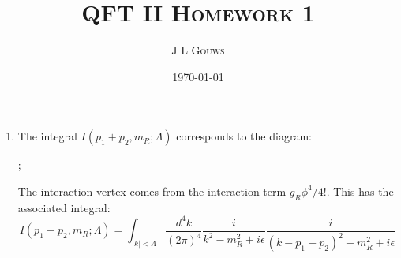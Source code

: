 \documentclass[12pt,a4]{article}
\title{
\textsc{QFT II Homework 1}
}
\author{\textsc{J L Gouws}
}
\date{\today
\\[1cm]}
\begin{document}
\thispagestyle{empty}

\maketitle

\begin{enumerate}
  \item
    \begin{enumerate}
      The integral $I(p_1 + p_2, m_R;\Lambda)$ corresponds to the diagram:

      \begin{center}
        ;

        The interaction vertex comes from the interaction term $g_R \phi^4 / 4!$.
        This has the associated integral:
        \begin{equation*}
          I(p_1 + p_2, m_R;\Lambda) = \int_{|k| < \Lambda} \frac{d^4 k}{(2 \pi)^4} \frac{i}{k^2 - m_R^2 + i \epsilon} \frac{i}{(k - p_1 - p_2)^2 - m_R^2 + i \epsilon}
        \end{equation*}
      \end{center}
    \end{enumerate}
\end{enumerate}
\end{document}
